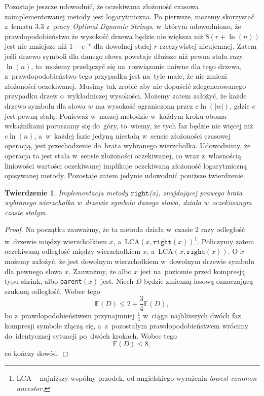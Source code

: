 \documentclass[declaration,shortabstract]{iithesis}
\theoremstyle{definition} \newtheorem{definition}{Definicja}[chapter]
\theoremstyle{remark} \newtheorem{remark}[definition]{Obserwacja}
\theoremstyle{plain} \newtheorem{theorem}[definition]{Twierdzenie}
\theoremstyle{remark} \newtheorem{example}{Przykład}[definition]
\theoremstyle{plain} \newtheorem{lemma}[definition]{Lemat}
\begin{document}
Pozostaje jeszcze udowodnić, że oczekiwana złożoność czasowa zaimplementowanej metody jest logarytmiczna. Po pierwsze, możemy skorzystać z~lematu 3.3 z~pracy \textit{Optimal Dynamic Strings}, w~którym udowodniono, że prawdopodobieństwo że wysokość drzewa będzie nie większa niż $8(r + \ln (n))$ jest nie mniejsze niż $1 - e^{-r}$ dla dowolnej stałej $r$ rzeczywistej nieujemnej. Zatem jeśli drzewo symboli dla danego słowa powstaje dłuższe niż pewna stała razy $\ln (n)$, to~możemy przełączyć się na~rozwiązanie naiwne dla tego drzewa, a~prawdopodobieństwo tego przypadku jest na~tyle małe, że nie zmieni złożoności oczekiwanej. Musimy tak zrobić aby nie dopuścić zdegenerowanego przypadku drzew o~wykładniczej wysokości. Możemy zatem założyć, że każde drzewo symbolu dla słowa $w$ ma wysokość ograniczoną przez $c\ln(|w|)$, gdzie $c$ jest pewną stałą. Ponieważ w~naszej metodzie w~każdym kroku oboma wskaźnikami poruszamy się do~góry, to~wiemy, że tych faz będzie nie więcej niż $c \ln(n)$, a~w~każdej fazie jedyną niestałą w~sensie złożoności czasowej operacją, jest przechodzenie do~brata wybranego wierzchołka. Udowodnimy, że operacja ta jest stała w~sensie złożoności oczekiwanej, co wraz z~własnością liniowości wartości oczekiwanej implikuje oczekiwaną złożoność logarytmiczną opisywanej metody. Pozostaje zatem jedynie udowodnić poniższe twierdzenie.

\begin{theorem}
    Implementacja metody $\texttt{right}$(x), znajdującej prawego brata wybranego wierzchołka w~drzewie symbolu danego słowa, działa w~oczekiwanym czasie stałym.
\end{theorem}

\begin{proof}
    Na początku zauważmy, że ta metoda działa w~czasie $2$ razy odległość w~drzewie między wierzchołkiem $x$, a~LCA$(x, \texttt{right}(x))$\footnote{LCA -- najniższy wspólny przodek, od angielskiego wyrażenia \textit{lowest common ancestor}.}. Policzymy zatem oczekiwaną odległość między wierzchołkiem $x$, a~LCA$(x, \texttt{right}(x))$. O $x$ możemy założyć, że jest dowolnym wierzchołkiem w~dowolnym drzewie symbolu dla pewnego słowa $x$. Zauważmy, że albo $x$ jest na~poziomie przed kompresją typu shrink, albo \texttt{parent}$(x)$ jest. Niech $D$ będzie zmienną losową oznaczającą szukaną odległość. Wobec tego $$\mathbb{E} (D) \leq 2 + \frac{3}{4} \mathbb{E} (D),$$ bo z~prawdopodobieństwem przynajmniej $\frac{1}{4}$ w~ciągu najbliższych dwóch faz kompresji symbole złączą się, a~z~pozostałym prawdopodobieństwem wrócimy do~identycznej sytuacji po~dwóch krokach. Wobec tego $$\mathbb{E} (D) \leq 8,$$ co kończy dowód.
\end{proof}
\end{document}
